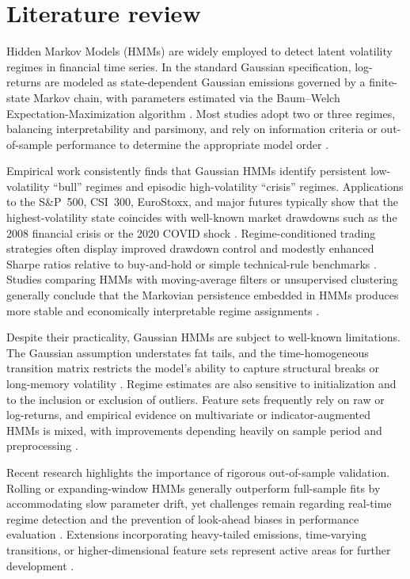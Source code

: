\documentclass[a4paper,fleqn]{cas-sc}
\begin{document}
\section{Literature review}

Hidden Markov Models (HMMs) are widely employed to detect latent volatility regimes in financial time series. In the standard Gaussian specification, log-returns are modeled as state-dependent Gaussian emissions governed by a finite-state Markov chain, with parameters estimated via the Baum--Welch Expectation-Maximization algorithm \cite{Rabiner1989, Holzmann2016}. Most studies adopt two or three regimes, balancing interpretability and parsimony, and rely on information criteria or out-of-sample performance to determine the appropriate model order \cite{Chen2020}.

Empirical work consistently finds that Gaussian HMMs identify persistent low-volatility ``bull'' regimes and episodic high-volatility ``crisis'' regimes. Applications to the S\&P~500, CSI~300, EuroStoxx, and major futures typically show that the highest-volatility state coincides with well-known market drawdowns such as the 2008 financial crisis or the 2020 COVID shock \cite{Wang2017, Duriez2025, Liu2017}. Regime-conditioned trading strategies often display improved drawdown control and modestly enhanced Sharpe ratios relative to buy-and-hold or simple technical-rule benchmarks \cite{Wang2020, Duriez2025}. Studies comparing HMMs with moving-average filters or unsupervised clustering generally conclude that the Markovian persistence embedded in HMMs produces more stable and economically interpretable regime assignments \cite{Ansari2025, LSEG2023}.

Despite their practicality, Gaussian HMMs are subject to well-known limitations. The Gaussian assumption understates fat tails, and the time-homogeneous transition matrix restricts the model's ability to capture structural breaks or long-memory volatility \cite{Ansari2025}. Regime estimates are also sensitive to initialization and to the inclusion or exclusion of outliers. Feature sets frequently rely on raw or log-returns, and empirical evidence on multivariate or indicator-augmented HMMs is mixed, with improvements depending heavily on sample period and preprocessing \cite{Chen2020, QuantConnect2023}.

Recent research highlights the importance of rigorous out-of-sample validation. Rolling or expanding-window HMMs generally outperform full-sample fits by accommodating slow parameter drift, yet challenges remain regarding real-time regime detection and the prevention of look-ahead biases in performance evaluation \cite{Duriez2025, Ansari2025}. Extensions incorporating heavy-tailed emissions, time-varying transitions, or higher-dimensional feature sets represent active areas for further development \cite{Wang2020, LSEG2023}.
\end{document}
